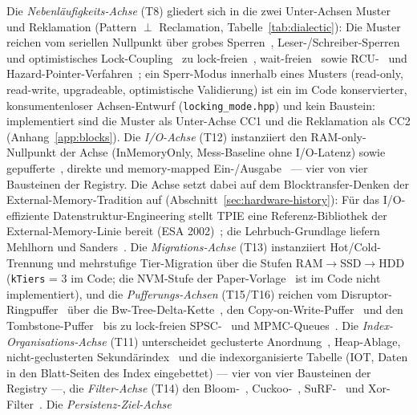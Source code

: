 \begin{nurlang}
Die \emph{Nebenläufigkeits-Achse} (T8) gliedert sich in die zwei Unter-Achsen Muster und Reklamation
(Pattern $\perp$ Reclamation, Tabelle~\ref{tab:dialectic}): Die Muster reichen vom seriellen Nullpunkt
über grobes Sperren~\cite{dijkstra1965concurrent}, Leser-/Schreiber-Sperren~\cite{courtois1971readers} und
optimistisches Lock-Coupling~\cite{leis2016olc} zu lock-freien~\cite{michael1996queue},
wait-freien~\cite{herlihy1991waitfree} sowie RCU-~\cite{mckenney2001rcu} und
Hazard-Pointer-Verfahren~\cite{michael2004hazard}; ein Sperr-Modus innerhalb eines Musters (read-only,
read-write, upgradeable, optimistische Validierung) ist ein im Code konservierter, konsumentenloser
Achsen-Entwurf (\texttt{locking\_\allowbreak{}mode.hpp}) und kein Baustein: implementiert sind die Muster als
Unter-Achse CC1 und die Reklamation als CC2 (Anhang~\ref{app:blocks}). Die \emph{I/O-Achse} (T12) instanziiert
den RAM-only-Nullpunkt der Achse (InMemoryOnly, Mess-Baseline ohne I/O-Latenz) sowie
gepufferte~\cite{stonebraker1981os}, direkte und memory-mapped Ein-/Ausgabe~\cite{crotty2022mmap} --- vier
von vier Bausteinen der Registry. Die Achse
setzt dabei auf dem Blocktransfer-Denken der External-Memory-Tradition auf
(Abschnitt~\ref{sec:hardware-history}): Für das I/O-effiziente Datenstruktur-Engineering stellt TPIE eine
Referenz-Bibliothek der External-Memory-Linie bereit (ESA 2002)~\cite{arge2002tpie}; die Lehrbuch-Grundlage liefern
Mehlhorn und Sanders~\cite{mehlhorn2008toolbox}. Die \emph{Migrations-Achse} (T13) instanziiert
Hot/Cold-Trennung und mehrstufige Tier-Migration über die Stufen RAM$\to$SSD$\to$HDD (\texttt{kTiers} = 3 im
Code; die NVM-Stufe der Paper-Vorlage~\cite{vanrenen2018nvm} ist im Code nicht implementiert), und die
\emph{Pufferungs-Achsen} (T15/T16) reichen vom Disruptor-Ringpuffer~\cite{thompson2011disruptor} über die
Bw-Tree-Delta-Kette~\cite{levandoski2013bwtree}, den Copy-on-Write-Puffer~\cite{driscoll1989persistent} und
den Tombstone-Puffer~\cite{oneil1996lsm} bis zu lock-freien SPSC-~\cite{lamport_spsc, lamport1983specifying} und
MPMC-Queues~\cite{michael1996queue}. Die \emph{Index-Organisations-Achse} (T11) unterscheidet geclusterte
Anordnung~\cite{bayer1972btree}, Heap-Ablage, nicht-geclusterten Sekundärindex~\cite{comer1979btree} und die
indexorganisierte Tabelle (IOT, Daten in den Blatt-Seiten des Index eingebettet) --- vier von vier
Bausteinen der Registry ---,
die \emph{Filter-Achse} (T14) den Bloom-~\cite{bloom1970}, Cuckoo-~\cite{fan2014cuckoo},
SuRF-~\cite{zhang2018surf} und Xor-Filter~\cite{graf2020xor}. Die \emph{Persistenz-Ziel-Achse}

\end{nurlang}
